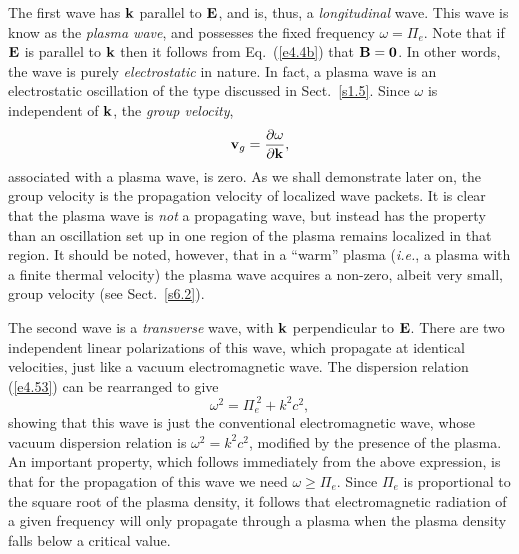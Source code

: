 The first wave has ${\bf k}$ parallel to ${\bf E}$, and is, thus, a
{\em longitudinal}\/ wave. This wave is know as the {\em plasma wave}, and
possesses the fixed frequency $\omega = {\Pi}_e$. Note that if
${\bf E}$ is parallel to ${\bf k}$ then it follows from Eq.~(\ref{e4.4b})
that ${\bf B} = {\bf 0}$. In other words, the wave is purely {\em electrostatic}\/
in nature. In fact, a plasma wave is an electrostatic oscillation of the type
discussed in Sect.~\ref{s1.5}.
Since $\omega$ is independent of ${\bf k}$,  the {\em group
velocity},
\begin{equation}\label{e4.54}
{\bf v}_g = \frac{\partial\omega}{\partial {\bf k}},
\end{equation}
associated with a plasma wave, 
is zero. As we shall demonstrate later on, the group velocity is the propagation
velocity of localized wave packets. It is clear that the plasma wave
is {\em not}\/ a propagating wave, but instead has the property than an oscillation
set up in one region of the plasma remains localized in that region. It
should be noted, however,  that in a ``warm'' plasma ({\em i.e.}, a plasma with a finite
thermal velocity) the plasma wave acquires a non-zero,
albeit very small, group velocity (see Sect.~\ref{s6.2}).

The second wave is a {\em transverse}\/ wave, with ${\bf k}$ perpendicular to 
${\bf E}$. There are two independent linear polarizations of this wave,
which propagate at identical velocities, 
just like a vacuum electromagnetic wave. The dispersion relation
(\ref{e4.53}) can be rearranged to give
\begin{equation}
\omega^2 = {\Pi}_e^{~2} + k^2 c^2,
\end{equation}
showing that this wave is just the conventional electromagnetic wave,
whose vacuum dispersion relation is $\omega^2=k^2 c^2$, modified by
the presence of the plasma. An important property, which follows
immediately from the above expression, is that for the propagation of
this wave we need $\omega\geq {\Pi}_e$. Since ${\Pi}_e$ is
proportional to the square root of the plasma density, it follows that
electromagnetic radiation of a given frequency will only propagate through
a plasma when the plasma density falls below a critical value. 

